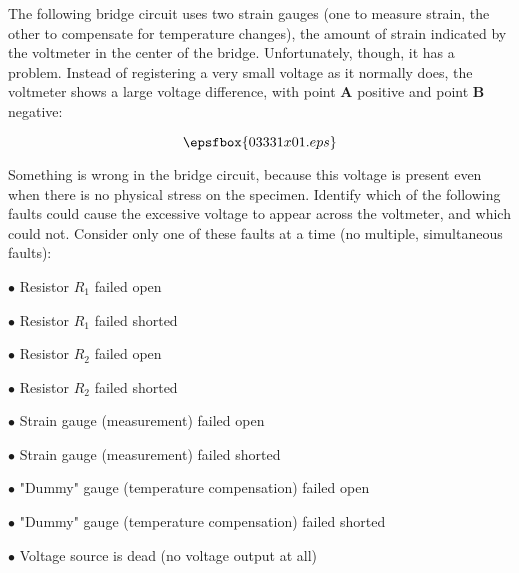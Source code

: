 

The following bridge circuit uses two strain gauges (one to measure strain, the other to compensate for temperature changes), the amount of strain indicated by the voltmeter in the center of the bridge.  Unfortunately, though, it has a problem.  Instead of registering a very small voltage as it normally does, the voltmeter shows a large voltage difference, with point {\bf A} positive and point {\bf B} negative:

$$\epsfbox{03331x01.eps}$$

\goodbreak
Something is wrong in the bridge circuit, because this voltage is present even when there is no physical stress on the specimen.  Identify which of the following faults could cause the excessive voltage to appear across the voltmeter, and which could not.  Consider only one of these faults at a time (no multiple, simultaneous faults):

\medskip
\item{$\bullet$} Resistor $R_1$ failed open
\item{$\bullet$} Resistor $R_1$ failed shorted
\item{$\bullet$} Resistor $R_2$ failed open
\item{$\bullet$} Resistor $R_2$ failed shorted
\item{$\bullet$} Strain gauge (measurement) failed open
\item{$\bullet$} Strain gauge (measurement) failed shorted
\item{$\bullet$} "Dummy" gauge (temperature compensation) failed open
\item{$\bullet$} "Dummy" gauge (temperature compensation) failed shorted
\item{$\bullet$} Voltage source is dead (no voltage output at all)
\medskip







